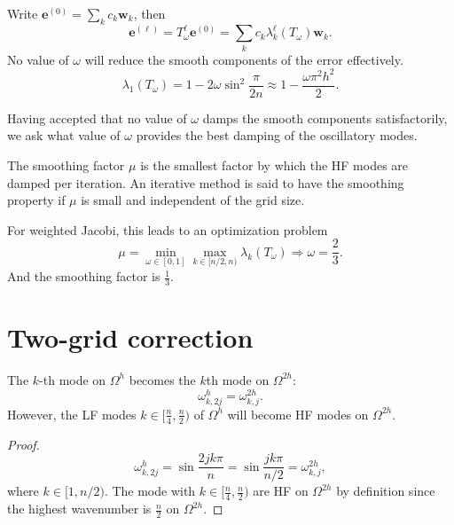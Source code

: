 Write $\mathbf{e}^{(0)}=\sum_kc_k\mathbf{w}_k$,
then
\begin{equation}
  \mathbf{e}^{(\ell)}=T^{\ell}_{\omega}\mathbf{e}^{(0)}=
  \sum_kc_k\lambda^{\ell}_k(T_{\omega})\mathbf{w}_k.
\end{equation}
No value of $\omega$ will reduce the smooth components of the error
effectively.
\begin{equation}
  \lambda_1(T_{\omega})=1-2\omega\sin^2\frac{\pi}{2n}
  \approx 1-\frac{\omega\pi^2h^2}{2}.
\end{equation}

\begin{rem}
  Having accepted that no value of $\omega$ damps the smooth
  components satisfactorily,
  we ask what value of $\omega$ provides the best damping of
  the oscillatory modes.
\end{rem}

\begin{defn}
  The smoothing factor $\mu$ is the smallest factor by
  which the HF modes are damped per iteration.
  An iterative method is said to have the smoothing property
  if $\mu$ is small and independent of the grid size.
\end{defn}

\begin{exm}
  For weighted Jacobi, this leads to an optimization problem
  \begin{equation}
    \mu =\min_{\omega\in[0,1]}\max_{k\in[n/2,n)}\lambda_k(T_{\omega})
    \Rightarrow \omega=\frac{2}{3}.
  \end{equation}
  And the smoothing factor is $\frac{1}{3}$.
\end{exm}


\section{Two-grid correction}

\label{sec:two-grid-correction}

\begin{prop}
  \label{prop:twoGridModes}
  The $k$-th mode on $\Omega^h$ becomes the $k$th mode on $\Omega^{2h}$:
  \begin{equation}
    \omega^h_{k,2j}=\omega^{2h}_{k,j}.
  \end{equation}
  However,
  the LF modes $k\in [\frac{n}{4},\frac{n}{2})$ of $\Omega^h$ will
  become HF modes on $\Omega^{2h}$.
\end{prop}

\begin{proof}
  \begin{equation}
    \omega^h_{k,2j}=\sin\frac{2jk\pi}{n}=\sin\frac{jk\pi}{n/2}
    =\omega^{2h}_{k,j},
  \end{equation}
  where $k\in[1,n/2)$.
  The mode with $k\in [\frac{n}{4},\frac{n}{2})$
  are HF on $\Omega^{2h}$ by definition since the
  highest wavenumber is $\frac{n}{2}$ on $\Omega^{2h}$.
\end{proof}

